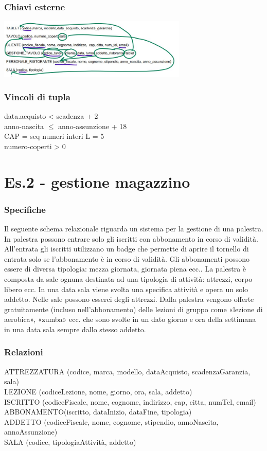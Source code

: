 \subsubsection{Chiavi esterne}
\begin{center}
    \includegraphics[width=0.675\textwidth]{chaptersLezioniSara/img/MR_altrofile_es1.jpg}
\end{center}

\subsubsection{Vincoli di tupla}
data.acquisto < scadenza + 2
\\anno-nascita $\leq$ anno-assunzione + 18
\\CAP = seq numeri interi L = 5
\\numero-coperti > 0

\section{Es.2 - gestione magazzino}
\subsubsection{Specifiche}
Il seguente schema relazionale riguarda un sistema per la gestione di una palestra. In palestra possono entrare solo gli iscritti con abbonamento in corso di validità. All'entrata gli iscritti utilizzano un badge che permette di aprire il tornello di entrata solo se l'abbonamento è in corso di validità. Gli abbonamenti possono essere di diversa tipologia: mezza giornata, giornata piena ecc.. La palestra è composta da sale ognuna destinata ad una tipologia di attività: attrezzi, corpo libero ecc. In una data sala viene svolta una specifica attività e opera un solo addetto. Nelle sale possono esserci degli attrezzi. Dalla palestra vengono offerte gratuitamente (incluso nell'abbonamento) delle lezioni di gruppo come «lezione di aerobica», «zumba» ecc. che sono svolte in un dato giorno e ora della settimana in una data sala sempre dallo stesso addetto.

\subsubsection{Relazioni}
ATTREZZATURA (codice, marca, modello, dataAcquisto, scadenzaGaranzia, sala)
\\LEZIONE (codiceLezione, nome, giorno, ora, sala, addetto)
\\ISCRITTO (codiceFiscale, nome, cognome, indirizzo, cap, citta, numTel, email)
\\ABBONAMENTO(iscritto, dataInizio, dataFine, tipologia)
\\ADDETTO (codiceFiscale, nome, cognome, stipendio, annoNascita, annoAssunzione)
\\SALA (codice, tipologiaAttività, addetto)

